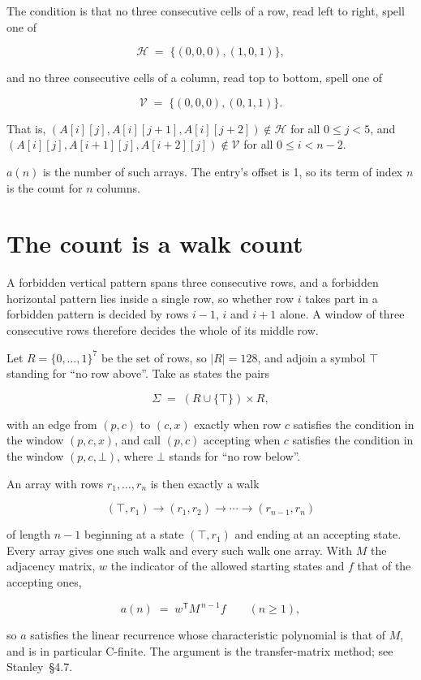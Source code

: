 \documentclass[11pt]{article}
\theoremstyle{definition}
\begin{document}
The condition is that no three consecutive cells of a row, read left to right, spell one of

\[\mathcal{H} \;=\; \{(0,0,0), (1,0,1)\},\]

and no three consecutive cells of a column, read top to bottom, spell one of

\[\mathcal{V} \;=\; \{(0,0,0), (0,1,1)\}.\]

That is, $(A[i][j],A[i][j{+}1],A[i][j{+}2]) \notin \mathcal{H}$ for all $0 \le j < 5$, and $(A[i][j],A[i{+}1][j],A[i{+}2][j]) \notin \mathcal{V}$ for all $0 \le i < n-2$.

$a(n)$ is the number of such arrays. The entry's offset is 1, so its term of index $n$ is the count for $n$ columns.

\section{The count is a walk count}

A forbidden vertical pattern spans three consecutive rows, and a forbidden horizontal pattern lies inside a single row, so whether row $i$ takes part in a forbidden pattern is decided by rows $i-1$, $i$ and $i+1$ alone. A window of three consecutive rows therefore decides the whole of its middle row.

Let $R = \{0,\dots,1\}^{7}$ be the set of rows, so $|R| = 128$, and adjoin a symbol $\top$ standing for ``no row above''. Take as states the pairs

\[\Sigma \;=\; (R \cup \{\top\}) \times R,\]

with an edge from $(p,c)$ to $(c,x)$ exactly when row $c$ satisfies the condition in the window $(p,c,x)$, and call $(p,c)$ accepting when $c$ satisfies the condition in the window $(p,c,\bot)$, where $\bot$ stands for ``no row below''.

An array with rows $r_1,\dots,r_n$ is then exactly a walk

\[(\top,r_1) \to (r_1,r_2) \to \cdots \to (r_{n-1},r_n)\]

of length $n-1$ beginning at a state $(\top,r_1)$ and ending at an accepting state. Every array gives one such walk and every such walk one array. With $M$ the adjacency matrix, $w$ the indicator of the allowed starting states and $f$ that of the accepting ones,

\[a(n) \;=\; w^{\mathsf T} M^{\,n-1} f \qquad (n \ge 1),\]

so $a$ satisfies the linear recurrence whose characteristic polynomial is that of $M$, and is in particular C-finite. The argument is the transfer-matrix method; see Stanley~\S4.7.
\end{document}
